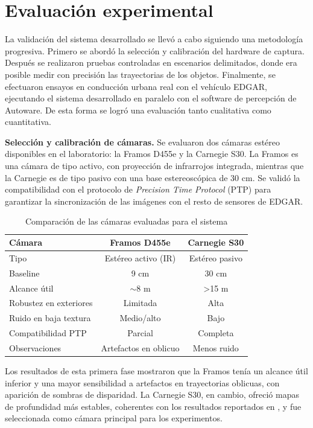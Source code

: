 \section{Evaluación experimental}
\label{sec:evaluacion_experimental}

La validación del sistema desarrollado se llevó a cabo siguiendo una
metodología progresiva. Primero se abordó la selección y calibración del
hardware de captura. Después se realizaron pruebas controladas en escenarios
delimitados, donde era posible medir con precisión las trayectorias de los
objetos. Finalmente, se efectuaron ensayos en conducción urbana real con el
vehículo EDGAR, ejecutando el sistema desarrollado en paralelo con el software
de percepción de Autoware. De esta forma se logró una evaluación tanto cualitativa
como cuantitativa.

\bigskip
\noindent \textbf{Selección y calibración de cámaras.}  
Se evaluaron dos cámaras estéreo disponibles en el laboratorio: la Framos D455e
y la Carnegie S30. La Framos es una cámara de tipo activo, con proyección de
infrarrojos integrada, mientras que la Carnegie es de tipo pasivo con una base
estereoscópica de 30 cm. Se validó la compatibilidad con el protocolo de
\textit{Precision Time Protocol} (PTP) para garantizar la sincronización de las
imágenes con el resto de sensores de EDGAR.

\begin{table}[H]
  \centering
  \begin{tabular}{|l|c|c|}
    \hline
    \textbf{Cámara} & \textbf{Framos D455e} & \textbf{Carnegie S30} \\ \hline
    Tipo & Estéreo activo (IR) & Estéreo pasivo \\
    Baseline & 9 cm & 30 cm \\
    Alcance útil & $\sim$8 m & >15 m \\
    Robustez en exteriores & Limitada & Alta \\
    Ruido en baja textura & Medio/alto & Bajo \\
    Compatibilidad PTP & Parcial & Completa \\
    Observaciones & Artefactos en oblicuo & Menos ruido \\ \hline
  \end{tabular}
  \caption{Comparación de las cámaras evaluadas para el sistema}
  \label{tab:camera_comparison}
\end{table}

Los resultados de esta primera fase mostraron que la Framos tenía un alcance
útil inferior y una mayor sensibilidad a artefactos en trayectorias oblicuas,
con aparición de sombras de disparidad. La Carnegie S30, en cambio, ofreció
mapas de profundidad más estables, coherentes con los resultados reportados en
\cite{paperCarnegie}, y fue seleccionada como cámara principal para los
experimentos.

